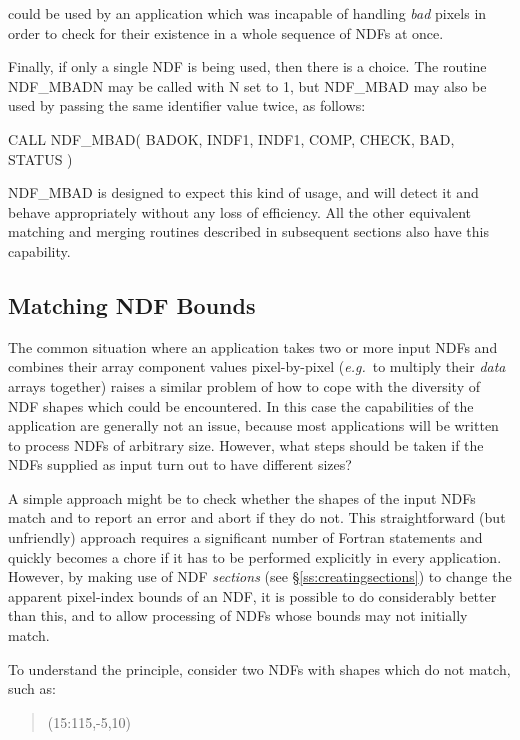 \documentclass[twoside,11pt,nolof]{starlink}
\providecommand{\st}[1]{{\emph{#1}}}
\begin{document}
could be used by an application which was incapable of handling \st{bad\/}
pixels in order to check for their existence in a whole sequence of NDFs at
once.

Finally, if only a single NDF is being used, then there is a choice.
The routine NDF\_MBADN may be called with N set to 1, but NDF\_MBAD may also
be used by passing the same identifier value twice, as follows:

\small
\begin{terminalv}
      CALL NDF_MBAD( BADOK, INDF1, INDF1, COMP, CHECK, BAD, STATUS )
\end{terminalv}
\normalsize

NDF\_MBAD is designed to expect this kind of usage, and will detect it and
behave appropriately without any loss of efficiency.
All the other equivalent matching and merging routines described in
subsequent sections also have this capability.

\subsection{\label{ss:mbnd}Matching NDF Bounds}

The common situation where an application takes two or more input NDFs and
combines their array component values pixel-by-pixel (\st{e.g.}\ to
multiply their \st{data\/} arrays together) raises a similar problem of how
to cope with the diversity of NDF shapes which could be encountered.
In this case the capabilities of the application are generally not an issue,
because most applications will be written to process NDFs of arbitrary size.
However, what steps should be taken if the NDFs supplied as input turn out
to have different sizes?

A simple approach might be to check whether the shapes of the input NDFs
match and to report an error and abort if they do not.
This straightforward (but unfriendly) approach requires a significant number
of Fortran statements and quickly becomes a chore if it has to be performed
explicitly in every application.
However, by making use of NDF \st{sections\/} (see
\S\ref{ss:creatingsections}) to change the apparent pixel-index bounds of an
NDF, it is possible to do considerably better than this, and to allow
processing of NDFs whose bounds may not initially match.

To understand the principle, consider two NDFs with shapes which do not
match, such as:

\small
\begin{quote}
\begin{center}
(15:115,-5,10)
\end{center}
\end{quote}
\normalsize
\end{document}
